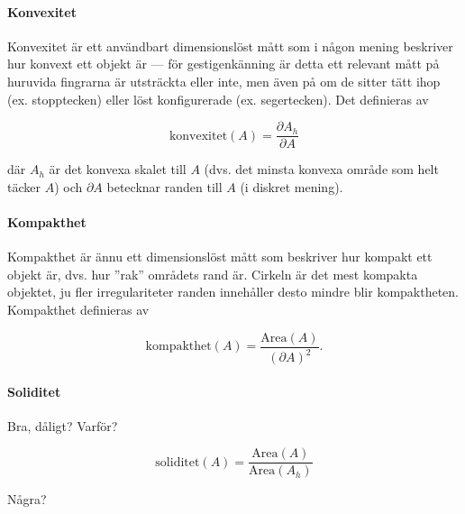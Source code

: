 \documentclass[klassificering]{subfiles}
\begin{document}
\paragraph{Konvexitet}

Konvexitet \cite[s.~26]{Rudemo09} är ett användbart dimensionslöst
mått som i någon mening beskriver hur konvext ett objekt är --- för
gestigenkänning är detta ett relevant mått på huruvida fingrarna är
utsträckta eller inte, men även på om de sitter tätt ihop (ex.
stopptecken) eller löst konfigurerade (ex. segertecken). Det
definieras av

\begin{equation*}
  \textrm{konvexitet}(A) = \frac{\partial A_h}{\partial A}
\end{equation*}

där $A_h$ är det konvexa skalet till $A$ (dvs. det minsta konvexa område som
helt täcker $A$) och $\partial A$ betecknar randen till $A$ (i diskret
mening).

\paragraph{Kompakthet}

Kompakthet \cite[s.~26]{Rudemo09} är ännu ett dimensionslöst mått som
beskriver hur kompakt ett objekt är, dvs. hur ''rak'' områdets rand
är. Cirkeln är det mest kompakta objektet, ju fler irregulariteter
randen innehåller desto mindre blir kompaktheten. Kompakthet
definieras av

\begin{equation*}
  \textrm{kompakthet}(A) = \frac{\textrm{Area}(A)}{\left(\partial
  A\right)^2}.
\end{equation*}

\paragraph{Soliditet}

Bra, dåligt? Varför?

\begin{equation*}
  \textrm{soliditet}(A) = \frac{\textrm{Area}(A)}{\textrm{Area}(A_h)}
\end{equation*}


Några?
\end{document}
